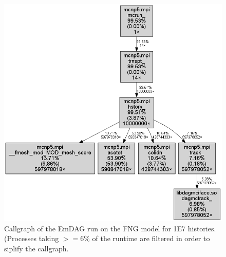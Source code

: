 \documentclass[12pt, a4paper]{article}
\begin{document}
\begin{figure}
  \centering
  \includegraphics[scale=0.45]{emdag_fng_cg_fine6.png}
  \caption{Callgraph of the EmDAG run on the FNG model for 1E7 histories. (Processes taking $>=$6\% of the runtime are filtered in order to siplify the callgraph.}
  \label{emdag-fng-coarse}  
\end{figure}
\newpage
\end{document}
